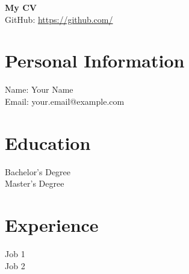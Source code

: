 \documentclass[a4paper,10pt]{article}
\begin{document}
\begin{center}
    \Huge{\textbf{My CV}}\\
    \vspace{5mm}
    \Large{GitHub: \url{https://github.com/}}
\end{center}

\section*{Personal Information}
Name: Your Name\\
Email: your.email@example.com

\section*{Education}
Bachelor's Degree\\
Master's Degree

\section*{Experience}
Job 1\\
Job 2
\end{document}
